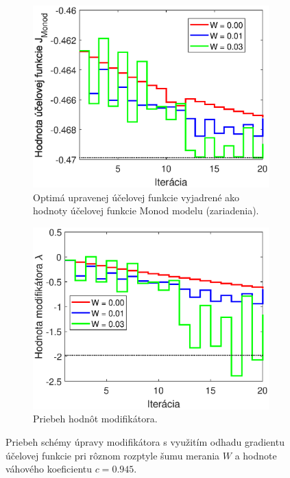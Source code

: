 \begin{figure}
	\centering
	\begin{subfigure}[b]{0.49\textwidth}
		\centering
		\includegraphics[width=\linewidth]{images/mas_noiseDist_costFun}
		\caption{Optimá upravenej účelovej funkcie vyjadrené ako hodnoty účelovej funkcie Monod modelu (zariadenia).}
		\label{fig:mas_noiseDist_costF}
	\end{subfigure}
	\hfill
	\begin{subfigure}[b]{0.49\textwidth}
		\centering
		\includegraphics[width=\linewidth]{images/mas_noiseDist_lam}
		\caption{Priebeh hodnôt modifikátora. \newline \newline}
		\label{fig:mas_noiseDist_lam}
	\end{subfigure}
	\caption{Priebeh schémy úpravy modifikátora s využitím odhadu gradientu účelovej funkcie pri rôznom rozptyle šumu merania $ W $ a hodnote váhového koeficientu $ c = 0.945 $.}
	\label{fig:mas_noiseDist}
\end{figure}

